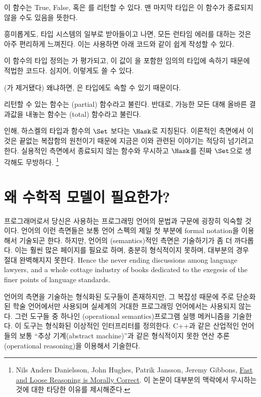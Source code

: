 이 함수는 True, False, 혹은 \code{\_|\_}를 리턴할 수 있다. 맨 마지막 타입은 이 함수가 종료되지 않을 수도 있음을 뜻한다.

흥미롭게도,  타입 시스템의 일부로 받아들이고 나면, 모든 런타임 에러를  대하는 것은 아주 편리하게 느껴진다. 이는   사용하면 아래 코드와 같이 쉽게 작성할 수 있다.


이 함수의 타입 정의는 가  평가되고, 이 값이 을 포함한 임의의 타입에 속하기 때문에 적법한 코드다. 심지어, 이렇게도 쓸 수 있다.


(가 제거됐다) 왜냐하면, \trBottom 은  타입에도 속할 수 있기 때문이다.

 리턴할 수 있는 함수는 \trPartial(partial) 함수라고 불린다. 반대로, 가능한 모든  대해 올바른 결과값을 내놓는 함수는 \trTotal(total) 함수라고 불린다.

 인해, 하스켈의 타입과 함수의  $\Set$ 보다는 $\Hask$로 지칭된다.
이론적인 측면에서 이것은 끝없는 복잡함의 원천이기 때문에 지금은 이와 관련된 이야기는 적당히 넘기려고 한다. 실용적인 측면에서 종료되지 않는 함수와  무시하고 $\Hask$를 진짜 $\Set$으로 생각해도 무방하다.
\footnote{Nils Anders Danielsson,
John Hughes, Patrik Jansson, Jeremy Gibbons, \href{http://www.cs.ox.ac.uk/jeremy.gibbons/publications/fast+loose.pdf}{
Fast and Loose Reasoning is Morally Correct}. 이 논문이 대부분의 맥락에서  무시하는 것에 대한 타당한 이유를 제시해준다.}

\section{왜 수학적 모델이 필요한가?}

프로그래머로서 당신은 사용하는 프로그래밍 언어의 문법과 구문에 굉장히 익숙할 것이다.
언어의 이런 측면들은 보통 언어 스펙의 제일 첫 부분에 formal notation을 이용해서 기술되곤 한다. %
하지만, 언어의 \trSemantics(semantics)적인 측면은 기술하기가 좀 더 까다롭다. 이는 훨씬 많은 페이지를 필요로 하며, 충분히 형식적이지 못하며, 대부분의 경우 절대 완벽해지지 못한다.
Hence the never ending discussions among language
lawyers, and a whole cottage industry of books dedicated to the exegesis
of the finer points of language standards.

언어의  측면을 기술하는 형식화된 도구들이 존재하지만, 그 복잡성 때문에 주로 단순화된 학술 언어에서만 사용되며 실세계의 거대한 프로그래밍 언어에서는 사용되지 않는다.
그런 도구들 중 하나인 \newterm{\trOperationalSemantics}(operational semantics)\는 프로그램 실행 메커니즘을 기술한다. 이 도구는 형식화된 이상적인 인터프리터를 정의한다.
C++과 같은 산업적인 언어들의  보통 ``추상 기계(abstract machine)''과 같은 형식적이지 못한 연산 추론(operational reasoning)을 이용해서 기술한다.

